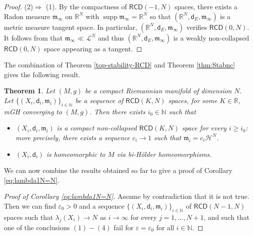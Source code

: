 \documentclass[a4paper]{amsart}
\theoremstyle{plain}
\newtheorem{theorem}[lemma]{Theorem}
\theoremstyle{definition}
\numberwithin{equation}{section}
\newcommand{\R}{\mathbb{R}}
\newcommand{\N}{\mathbb{N}}
\newcommand{\RCD}{\mathsf{RCD}}
\newcommand{\mm}{\mathfrak m}
\newcommand{\sfd}{\mathsf d}
\newcommand{\cL}{\mathcal{L}}
\newcommand{\cH}{\mathcal{H}}
\DeclareMathOperator{\supp}{supp}
\begin{document}
{{{\begin{proof}
(2)$ \Rightarrow$ (1). By the compactness of $\RCD(-1,N)$ spaces, there exists a Radon measure $\mm_{\infty}$ on $\R^{N}$ with $\supp \mm_{\infty}=\R^{N}$ so that   $(\R^{N},\sfd_{E}, \mm_{\infty})$ is a metric measure tangent space. In particular,  $(\R^{N},\sfd_{E}, \mm_{\infty})$ verifies $\RCD(0,N)$. It follows from \cite[Corollary 8.2]{CaMoAIM} that $\mm_{\infty}\ll \cL^{N}$ and thus $(\R^{N},\sfd_{E}, \mm_{\infty})$ is a weakly non-collapsed $\RCD(0,N)$ space appearing as a tangent.

\end{proof}
}

The combination of  Theorem \ref{top-stability-RCD} and Theorem \ref{thm:Stabnc} gives the following result.

\begin{theorem}\label{thm:XiMman} 
Let $(M,g)$ be a compact Riemannian manifold of dimension $N$. {Let $\{(X_{i}, \sfd_{i},\mm_{i})\}_{i\in \N}$ be a sequence of $\RCD(K,N)$ spaces, for some $K\in \R$,  mGH converging to 
$(M,g)$.} Then there exists $i_{0}\in \N$ such that 
\begin{itemize}
\item $(X_{i}, \sfd_{i},\mm_{i})$ is a compact non-collapsed $\RCD(K,N)$ space for every $i\geq i_{0}$: more precisely, there exists a sequence $c_{i}\to 1$ such that $\mm_{i}=c_{i} \cH^{N}$.
\item $(X_{i}, \sfd_{i})$ is homeomorphic to $M$ via bi-H\"older homeomorphisms.
\end{itemize}
\end{theorem}

{
 We can now combine the results obtained so far to give a proof of Corollary \ref{eq:lambda1N=N}.}
}

{
\begin{proof}[Proof of Corollary \ref{eq:lambda1N=N}]
Assume by contradiction that it is not true. Then we can find $\varepsilon_{0}>0$ and  a sequence $\{(X_{i},\sfd_{i},\mm_{i})\}_{i\in \N}$ of $\RCD(N-1,N)$ spaces such that $\lambda_{j}(X_{i})\to N$ as $i\to \infty$ for every $j=1,\dots, N+1$, and such that one of the conclusions $(1)-(4)$ fail for  $\varepsilon=\varepsilon_{0}$ for all $i\in \N$.


\end{proof}}}
\end{document}
